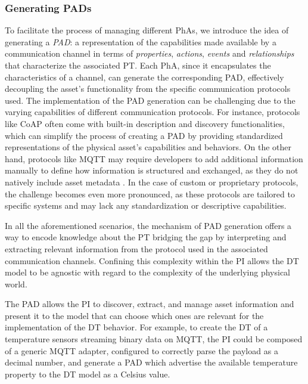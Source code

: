 \subsubsection{Generating \aclp{PAD}}
To facilitate the process of managing different \acp{PhA}, we introduce the idea of generating a \emph{\ac{PAD}}: a representation of the capabilities made available by a communication channel in terms of \emph{properties}, \emph{actions}, \emph{events} and \emph{relationships} that characterize the associated \ac{PT}.
%
Each \ac{PhA}, since it encapsulates the characteristics of a channel, can generate the corresponding \ac{PAD}, effectively decoupling the asset's functionality from the specific communication protocols used.
%
The implementation of the \ac{PAD} generation can be challenging due to the varying capabilities of different communication protocols.
For instance, protocols like CoAP\cite{RFC7252} often come with built-in description and discovery functionalities, which can simplify the process of creating a \ac{PAD} by providing standardized representations of the physical asset's capabilities and behaviors.
On the other hand, protocols like MQTT may require developers to add additional information manually to define how information is structured and exchanged, as they do not natively include asset metadata \cite{mqtt}.
In the case of custom or proprietary protocols, the challenge becomes even more pronounced, as these protocols are tailored to specific systems and may lack any standardization or descriptive capabilities.

In all the aforementioned scenarios, the mechanism of \ac{PAD} generation offers a way to encode knowledge about the \ac{PT} bridging the gap by interpreting and extracting relevant information from the protocol used in the associated communication channels.
%
Confining this complexity within the \ac{PI} allows the \ac{DT} model to be agnostic with regard to the complexity of the underlying physical world.

The \ac{PAD} allows the \ac{PI} to discover, extract, and manage asset information and present it to the model that can choose which ones are relevant for the implementation of the \ac{DT} behavior.
%
For example, to create the \ac{DT} of a temperature sensors streaming binary data on MQTT, the \ac{PI} could be composed of a generic MQTT adapter, configured to correctly parse the payload as a decimal number, and generate a \ac{PAD} which advertise the available temperature property to the \ac{DT} model as a Celsius value. 

